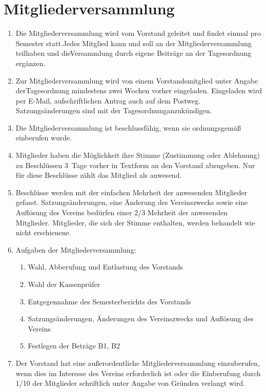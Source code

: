 \documentclass[a4paper]{scrartcl}
\begin{document}
\section{Mitgliederversammlung}
\begin{enumerate}
    \item Die Mitgliederversammlung wird vom Vorstand geleitet und findet
          einmal pro Semester statt.Jedes Mitglied kann und soll an der
          Mitgliederversammlung teilhaben und dieVersammlung durch eigene Beiträge an
          der Tagesordnung ergänzen.
    \item Zur Mitgliederversammlung wird von einem Vorstandsmitglied unter
          Angabe derTagesordnung mindestens zwei Wochen vorher eingeladen.
          Eingeladen wird per E-Mail, aufschriftlichen Antrag auch auf dem
          Postweg. Satzungsänderungen sind mit der Tagesordnunganzukündigen.
    \item Die Mitgliederversammlung ist beschlussfähig, wenn sie ordnungsgemäß
          einberufen wurde.
    \item Mitglieder haben die Möglichkeit ihre Stimme (Zustimmung oder
          Ablehnung) zu Beschlüssen 3~Tage vorher in Textform an den Vorstand
          abzugeben. Nur für diese Beschlüsse zählt das Mitglied als anwesend.
    \item Beschlüsse werden mit der einfachen Mehrheit der anwesenden Mitglieder gefasst.
          Satzungsänderungen, eine Änderung des Vereinszwecks sowie eine
          Auflösung des Vereins bedürfen einer 2/3 Mehrheit der anwesenden
          Mitglieder. Mitglieder, die sich der Stimme enthalten, werden
          behandelt wie nicht erschienene.
    \item Aufgaben der Mitgliederversammlung:
        \begin{enumerate}
            \item Wahl, Abberufung und Entlastung des Vorstands
            \item Wahl der Kassenprüfer
            \item Entgegennahme des Semesterberichts des Vorstands
            \item Satzungsänderungen, Änderungen des Vereinszwecks und
                  Auflösung des Vereins
            \item Festlegen der Beträge B1, B2
        \end{enumerate}
    \item Der Vorstand hat eine außerordentliche Mitgliederversammlung
          einzuberufen, wenn dies im Interesse des Vereins erforderlich ist
          oder die Einberufung durch 1/10 der Mitglieder schriftlich unter
          Angabe von Gründen verlangt wird.
\end{enumerate}
\end{document}
